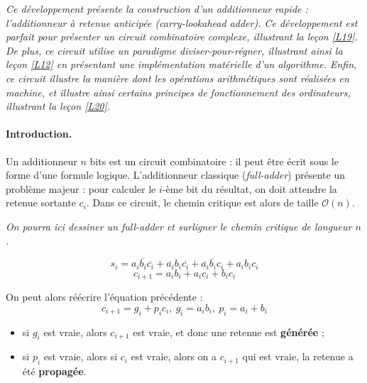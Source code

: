 

\textit{
Ce développement présente la construction d'un additionneur rapide : l'additionneur à retenue anticipée (carry-lookahead adder). Ce développement est parfait pour présenter un circuit combinatoire complexe, illustrant la leçon \ref{L19}. De plus, ce circuit utilise un paradigme diviser-pour-régner, illustrant ainsi la leçon \ref{L12} en présentant une implémentation matérielle d'un algorithme. Enfin, ce circuit illustre la manière dont les opérations arithmétiques sont réalisées en machine, et illustre ainsi certains principes de fonctionnement des ordinateurs, illustrant la leçon \ref{L20}. }



\paragraph{Introduction.} Un additionneur $n$ bits est un circuit combinatoire : il peut être écrit sous le forme d'une formule logique. L'additionneur classique (\textit{full-adder}) présente un problème majeur : pour calculer le $i$-ème bit du résultat, on doit attendre la retenue sortante $c_i$. Dans ce circuit, le chemin critique est alors de taille $\mathcal{O}(n)$.\newline

\textit{
On pourra ici dessiner un full-adder et surligner le chemin critique de longueur $n$.
}

\begin{equation}
s_i = a_i\overline{b_i}\overline{c_i} + \overline{a_i}b_i\overline{c_i} + \overline{a_i}\overline{b_i}c_i + a_ib_ic_i
\end{equation}
\begin{equation}
c_{i+1}=a_ib_i+a_ic_i + b_ic_i
\end{equation}

On peut alors réécrire l'équation précédente :
\begin{equation}
c_{i+1}=g_i + p_ic_i,~ g_i=a_ib_i, ~ p_i=a_i+b_i
\end{equation}
\begin{itemize}
\item si $g_i$ est vraie, alors $c_{i+1}$ est vraie, et donc une retenue est \textbf{générée} ;
\item si $p_i$ est vraie, alors si $c_i$ est vraie, alors on a $c_{i+1}$ qui est vraie, la retenue a été \textbf{propagée}.
\end{itemize}

